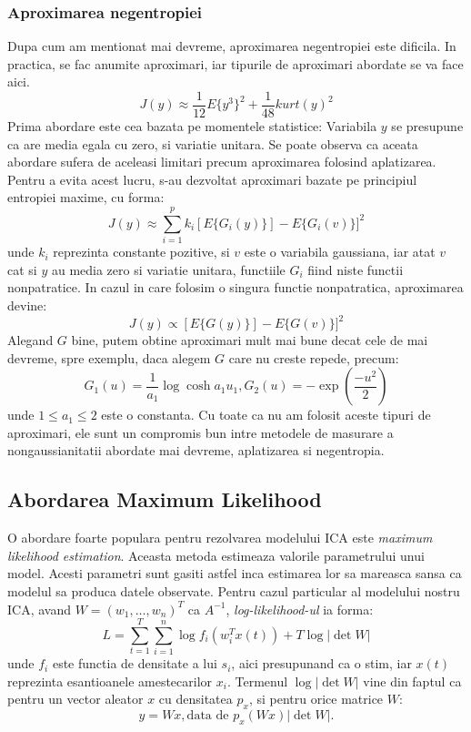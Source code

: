 \documentclass[12pt]{article}
\begin{document}
\subsubsection{Aproximarea negentropiei}
Dupa cum am mentionat mai devreme, aproximarea negentropiei este dificila. In practica, se fac anumite aproximari, iar tipurile de aproximari abordate se va face aici. 
\begin{equation}
	J(y)\approx \frac{1}{12}E\{y^3\}^2 + \frac{1}{48}kurt(y)^2
\end{equation}
Prima abordare este cea bazata pe momentele statistice:
Variabila $y$ se presupune ca are media egala cu zero, si variatie unitara. Se poate observa ca aceata abordare sufera de aceleasi limitari precum aproximarea folosind aplatizarea. Pentru a evita acest lucru, s-au dezvoltat aproximari bazate pe principiul entropiei maxime, cu forma:
\begin{equation}
	J(y)\approx\sum_{i=1}^p k_i[E\{G_i(y)\}]-E\{G_i(v)\}]^2
\end{equation}
unde $k_i$ reprezinta constante pozitive, si $v$ este o variabila gaussiana, iar atat $v$ cat si $y$ au media zero si variatie unitara, functiile $G_i$ fiind niste functii nonpatratice. In cazul in care folosim o singura functie nonpatratica, aproximarea devine:
\begin{equation}
	J(y)\propto[E\{G(y)\}]-E\{G(v)\}]^2
\end{equation}
Alegand $G$ bine, putem obtine aproximari mult mai bune decat cele de mai devreme, spre exemplu, daca alegem $G$ care nu creste repede, precum:
\begin{equation}
	G_1(u)=\frac{1}{a_1}\log \cosh a_1 u_1, G_2(u)=-\exp(\frac{-u^2}{2})
\end{equation}
unde $1\leq a_1 \leq 2$ este o constanta. Cu toate ca nu am folosit aceste tipuri de aproximari, ele sunt un compromis bun intre metodele de masurare a nongaussianitatii abordate mai devreme, aplatizarea si negentropia. 
\newpage
\subsection{Abordarea Maximum Likelihood}
O abordare foarte populara pentru rezolvarea modelului ICA este \textit{maximum likelihood estimation}. Aceasta metoda estimeaza valorile parametrului unui model. Acesti parametri sunt gasiti astfel inca estimarea lor sa mareasca sansa ca modelul sa produca datele observate. Pentru cazul particular al modelului nostru ICA, avand $W=(w_1, \dots, w_n)^T$ ca $A^{-1}$, \textit{log-likelihood-ul} ia forma:
\begin{equation}
	L=\sum_{t=1}^T \sum_{i=1}^n \log f_i(w_i^Tx(t)) + T \log |\det W|
\end{equation}
unde $f_i$ este functia de densitate a lui $s_i$, aici presupunand ca o stim, iar $x(t)$ reprezinta esantioanele amestecarilor $x_i$. Termenul $\log | \det W|$ vine din faptul ca pentru un vector aleator $x$ cu densitatea $p_x$, si pentru orice matrice $W$:
\begin{equation}
	y=Wx, \text{data de } p_x(Wx)|\det W|.
\end{equation}
\end{document}
